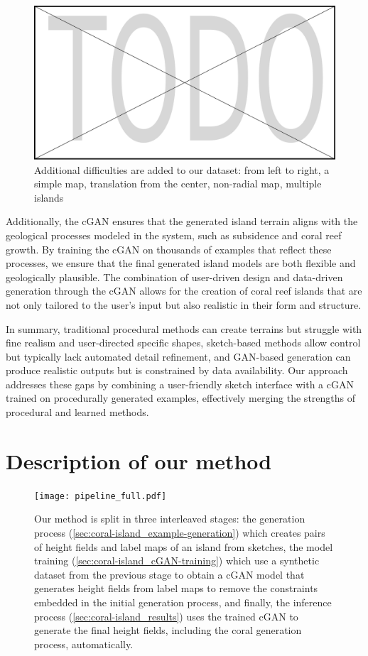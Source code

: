 \begin{figure}[H]
    \includegraphics[width=0.9 \linewidth]{placeholder.pdf}
    \caption{Additional difficulties are added to our dataset: from left to right, a simple map, translation from the center, non-radial map, multiple islands}
    \label{fig:coral-island_difficulties-dataset}
\end{figure}

Additionally, the cGAN ensures that the generated island terrain aligns with the geological processes modeled in the system, such as subsidence and coral reef growth. By training the cGAN on thousands of examples that reflect these processes, we ensure that the final generated island models are both flexible and geologically plausible. The combination of user-driven design and data-driven generation through the cGAN allows for the creation of coral reef islands that are not only tailored to the user's input but also realistic in their form and structure.

\midConclusion
In summary, traditional procedural methods can create terrains but struggle with fine realism and user-directed specific shapes, sketch-based methods allow control but typically lack automated detail refinement, and GAN-based generation can produce realistic outputs but is constrained by data availability. Our approach addresses these gaps by combining a user-friendly sketch interface with a cGAN trained on procedurally generated examples, effectively merging the strengths of procedural and learned methods.


\section{Description of our method}
\label{sec:coral-island_method-description}


\begin{figure}[H]
    \texttt{[image: pipeline\_full.pdf]}
    \caption{Our method is split in three interleaved stages: the generation process (\cref{sec:coral-island_example-generation}) which creates pairs of height fields and label maps of an island from sketches, the model training (\cref{sec:coral-island_cGAN-training}) which use a synthetic dataset from the previous stage to obtain a cGAN model that generates height fields from label maps to remove the constraints embedded in the initial generation process, and finally, the inference process (\cref{sec:coral-island_results}) uses the trained cGAN to generate the final height fields, including the coral generation process, automatically. }
    \label{fig:coral-island_pipeline}
\end{figure}

